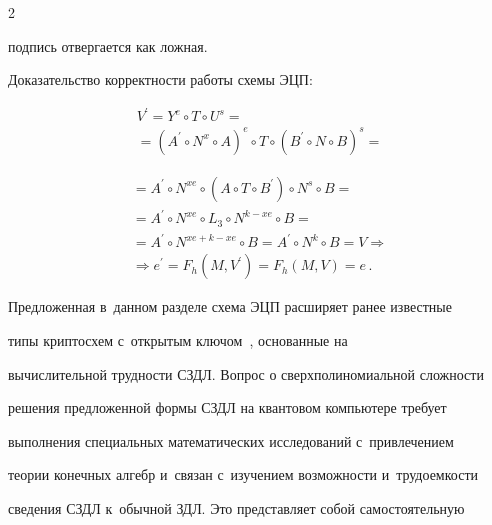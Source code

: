 \begin{multicols}{2}
\begin{enumerate}[1.]
подпись отвергается как ложная. 


  \end{enumerate}


  


  Доказательство корректности работы схемы ЭЦП: 


  \begin{multline*}


 V^\prime =Y^e\circ T\circ U^s ={}\\


 {}=\left( A^\prime\circ N^x\circ A\right)^e\circ 


T\circ \left( B^\prime \circ N\circ B\right)^s={}


\end{multline*}





\noindent


  \begin{multline*}


    {}= A^\prime \circ N^{xe} \circ(A\circ T\circ B^\prime)\circ N^s\circ B= {}\\


{}=A^\prime \circ N^{xe}\circ L_3\circ N^{k-xe}\circ B={}\\


  {}= A^\prime \circ N^{xe+k-xe} \circ B =A^\prime \circ N^k \circ B 


=V\Rightarrow{}\\


{}\Rightarrow 


  e^\prime =F_h(M,V^\prime) =F_h(M,V)=e\,.


  \end{multline*}


  


  Предложенная в~данном разделе схема ЭЦП расширяет ранее известные 


типы криптосхем с~открытым ключом~\cite{4-f}, основанные на 


вычислительной трудности СЗДЛ. Вопрос о сверхполиномиальной сложности 


решения предложенной формы СЗДЛ на квантовом компьютере требует 


выполнения специальных математических исследований с~привлечением 


теории конечных алгебр и~связан с~изучением возможности и~трудоемкости 


сведения СЗДЛ к~обычной ЗДЛ. Это представляет собой самостоятельную 



\end{multicols}
